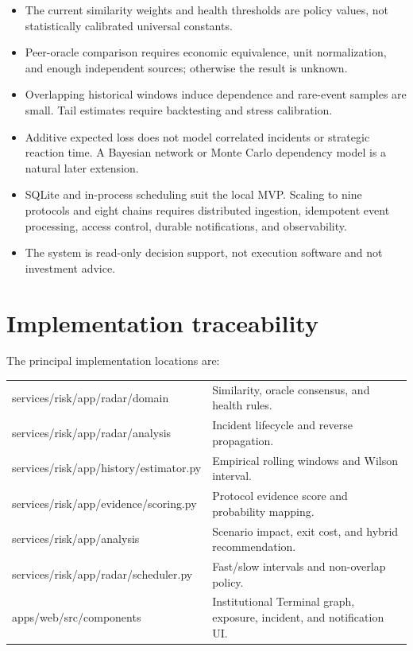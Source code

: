 \documentclass[11pt,a4paper]{article}
\begin{document}
\begin{itemize}
  \item The current similarity weights and health thresholds are policy values,
        not statistically calibrated universal constants.
  \item Peer-oracle comparison requires economic equivalence, unit normalization,
        and enough independent sources; otherwise the result is unknown.
  \item Overlapping historical windows induce dependence and rare-event samples
        are small.  Tail estimates require backtesting and stress calibration.
  \item Additive expected loss does not model correlated incidents or strategic
        reaction time.  A Bayesian network or Monte Carlo dependency model is a
        natural later extension.
  \item SQLite and in-process scheduling suit the local MVP.  Scaling to nine
        protocols and eight chains requires distributed ingestion, idempotent
        event processing, access control, durable notifications, and observability.
  \item The system is read-only decision support, not execution software and not
        investment advice.
\end{itemize}

\section{Implementation traceability}

The principal implementation locations are:
\begin{longtable}{>{\ttfamily}p{}p{}}
\toprule
services/risk/app/radar/domain & Similarity, oracle consensus, and health rules.\\
services/risk/app/radar/analysis & Incident lifecycle and reverse propagation.\\
services/risk/app/history/estimator.py & Empirical rolling windows and Wilson interval.\\
services/risk/app/evidence/scoring.py & Protocol evidence score and probability mapping.\\
services/risk/app/analysis & Scenario impact, exit cost, and hybrid recommendation.\\
services/risk/app/radar/scheduler.py & Fast/slow intervals and non-overlap policy.\\
apps/web/src/components & Institutional Terminal graph, exposure, incident, and notification UI.\\
\bottomrule
\end{longtable}
\end{document}
